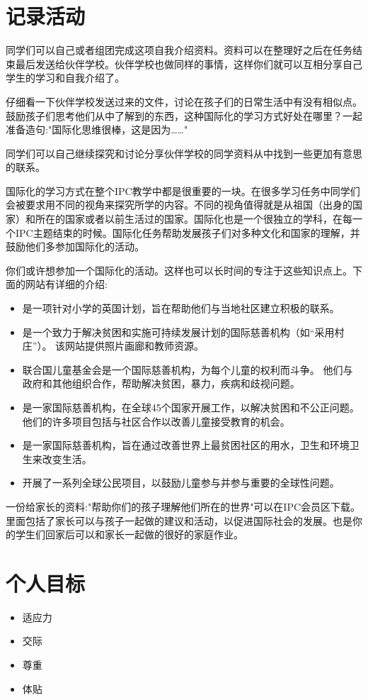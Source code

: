 \section{记录活动}
    同学们可以自己或者组团完成这项自我介绍资料。资料可以在整理好之后在任务结束最后发送给伙伴学校。伙伴学校也做同样的事情，这样你们就可以互相分享自己学生的学习和自我介绍了。\par
    仔细看一下伙伴学校发送过来的文件，讨论在孩子们的日常生活中有没有相似点。鼓励孩子们思考他们从中了解到的东西，这种国际化的学习方式好处在哪里？一起准备造句:"国际化思维很棒，这是因为……"\par
    同学们可以自己继续探究和讨论分享伙伴学校的同学资料从中找到一些更加有意思的联系。\par
    国际化的学习方式在整个IPC教学中都是很重要的一块。在很多学习任务中同学们会被要求用不同的视角来探究所学的内容。不同的视角值得就是从祖国（出身的国家）和所在的国家或者以前生活过的国家。国际化也是一个很独立的学科，在每一个IPC主题结束的时候。国际化任务帮助发展孩子们对多种文化和国家的理解，并鼓励他们多参加国际化的活动。\par
    你们或许想参加一个国际化的活动。这样也可以长时间的专注于这些知识点上。下面的网站有详细的介绍:\par
    \begin{itemize}
      \item {}是一项针对小学的英国计划，旨在帮助他们与当地社区建立积极的联系。
      \item {}是一个致力于解决贫困和实施可持续发展计划的国际慈善机构（如“采用村庄”）。 该网站提供照片画廊和教师资源。
      \item {}联合国儿童基金会是一个国际慈善机构，为每个儿童的权利而斗争。 他们与政府和其他组织合作，帮助解决贫困，暴力，疾病和歧视问题。
      \item {}是一家国际慈善机构，在全球45个国家开展工作，以解决贫困和不公正问题。 他们的许多项目包括与社区合作以改善儿童接受教育的机会。
      \item {}是一家国际慈善机构，旨在通过改善世界上最贫困社区的用水，卫生和环境卫生来改变生活。
      \item {}开展了一系列全球公民项目，以鼓励儿童参与并参与重要的全球性问题。
    \end{itemize}  
    
    \begin{note}
      一份给家长的资料:"帮助你们的孩子理解他们所在的世界"可以在IPC会员区下载。里面包括了家长可以与孩子一起做的建议和活动，以促进国际社会的发展。也是你的学生们回家后可以和家长一起做的很好的家庭作业。
    \end{note}  

\section{个人目标}
    \begin{itemize}
      \item 适应力
      \item 交际 
      \item 尊重
      \item 体贴  
     \end{itemize} 

